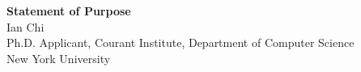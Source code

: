 \documentclass[11pt]{article}
\begin{document}
\begin{center}
    {\Large \textbf{Statement of Purpose}}\\[4pt]
    {\large Ian Chi}\\[2pt]
    Ph.D. Applicant, Courant Institute, Department of Computer Science\\
    New York University
\end{center}

\vspace{1em}

\end{document}
